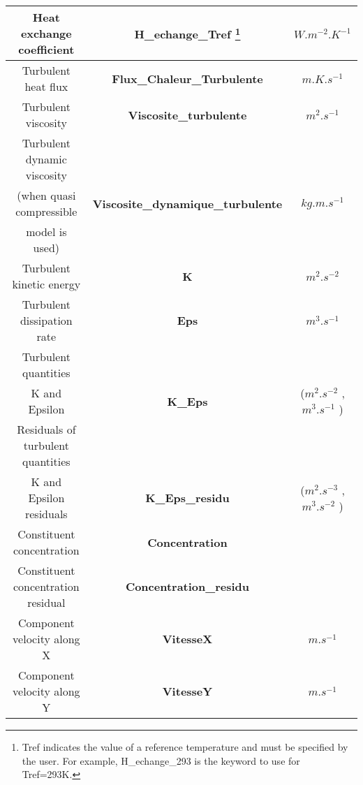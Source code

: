 \begin{longtable}[hcr]{|c|c|c|}
Heat exchange coefficient                       & \textbf{H\_echange\_Tref} \footnote{Tref indicates the value of a reference temperature and must be specified by the user. For example, H\_echange\_293 is the keyword to use for Tref=293K.}            & $W.m^{-2}.K^{-1}$ \\ \hline
Turbulent heat flux                             & \textbf{Flux\_Chaleur\_Turbulente}        & $m.K.s^{-1}$ \\ \hline
Turbulent viscosity                             & \textbf{Viscosite\_turbulente}            & $m^2.s^{-1}$ \\ \hline
Turbulent dynamic viscosity                     &                                           & \\
(when quasi compressible                        & \textbf{Viscosite\_dynamique\_turbulente} & $kg.m.s^{-1}$ \\
 model is used)                                 &                                           & \\ \hline
Turbulent kinetic energy                        & \textbf{K}                                & $m^2.s^{-2}$ \\ \hline
Turbulent dissipation rate                      & \textbf{Eps}                              & $m^3.s^{-1}$ \\ \hline
Turbulent quantities                            &                                           & \\
K and Epsilon                                   & \textbf{K\_Eps}                           & ($m^2.s^{-2}$ ,$m^3.s^{-1}$ ) \\ \hline
Residuals of turbulent quantities               &                                           & \\
K and Epsilon residuals                         & \textbf{K\_Eps\_residu}                   & ($m^2.s^{-3}$ ,$m^3.s^{-2}$ ) \\ \hline
Constituent concentration                       & \textbf{Concentration}                    & \\ \hline
Constituent concentration residual              & \textbf{Concentration\_residu}            & \\ \hline
Component velocity along X                      & \textbf{VitesseX}                         & $m.s^{-1}$ \\ \hline
Component velocity along Y                      & \textbf{VitesseY}                         & $m.s^{-1}$ \\ \hline

\end{longtable}
